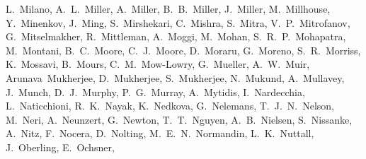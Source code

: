 {L.~Milano, %
A.~L.~Miller,  %
A.~Miller,  %
B.~B.~Miller,  %
J.~Miller, 	%
M.~Millhouse,  %
Y.~Minenkov, %
J.~Ming,  %
S.~Mirshekari,  %
C.~Mishra,  %
S.~Mitra,  %
V.~P.~Mitrofanov,  %
G.~Mitselmakher, %
R.~Mittleman,  %
A.~Moggi, %
M.~Mohan, %
S.~R.~P.~Mohapatra,  %
M.~Montani, %
B.~C.~Moore,  %
C.~J.~Moore,  %
D.~Moraru,  %
G.~Moreno,  %
S.~R.~Morriss,  %
K.~Mossavi,  %
B.~Mours, %
C.~M.~Mow-Lowry,  %
G.~Mueller,  %
A.~W.~Muir,  %
Arunava~Mukherjee,  %
D.~Mukherjee,  %
S.~Mukherjee,  %
N.~Mukund,  %
A.~Mullavey,  %
J.~Munch,  %
D.~J.~Murphy,  %
P.~G.~Murray,  %
A.~Mytidis,  %
I.~Nardecchia, %
L.~Naticchioni, %
R.~K.~Nayak,  %
K.~Nedkova,  %
G.~Nelemans, %
T.~J.~N.~Nelson,  %
M.~Neri, %
A.~Neunzert,  %
G.~Newton,  %
T.~T.~Nguyen,  %
A.~B.~Nielsen,  %
S.~Nissanke, %
A.~Nitz,  %
F.~Nocera, %
D.~Nolting,  %
M.~E.~N.~Normandin,  %
L.~K.~Nuttall,  %
J.~Oberling,  %
E.~Ochsner,  %
}
